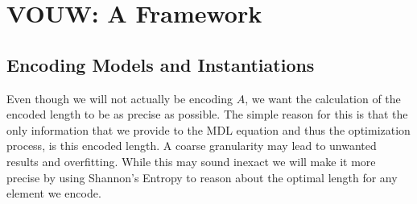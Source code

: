 \documentclass{llncs}
\begin{document}
\section{VOUW: A Framework}
\subsection{Encoding Models and Instantiations}
Even though we will not actually be encoding $A$, we want the calculation of the encoded length to be as precise as possible. The simple reason for this is that the only information that we provide to the MDL equation and thus the optimization process, is this encoded length. A coarse granularity may lead to unwanted results and overfitting. While this may sound inexact we will  make it more precise by using Shannon's Entropy to reason about the optimal length for any element we encode.
\end{document}
